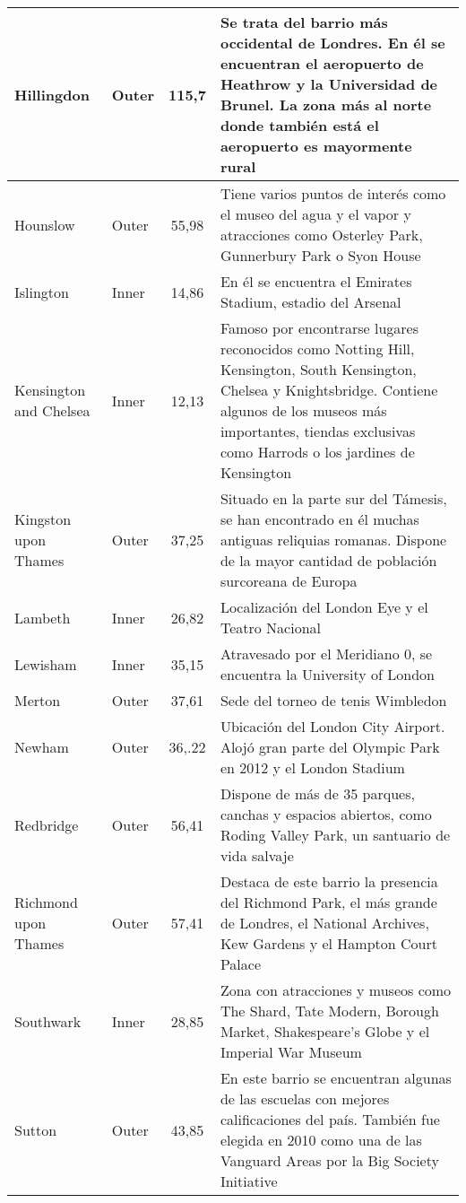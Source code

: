 \documentclass[12pt,a4paper,twoside]{book}
\begin{document}
\begin{longtable}{>{\raggedright\arraybackslash}p{7em}lc>{\raggedright\arraybackslash}m{22em}}
\hline
Hillingdon & Outer & 115,7 & Se trata del barrio más occidental de Londres. En él se encuentran el aeropuerto de Heathrow y la Universidad de Brunel. La zona más al norte donde también está el aeropuerto es mayormente rural \\
\hline
Hounslow & Outer & 55,98 & Tiene varios puntos de interés como el museo del agua y el vapor y atracciones como Osterley Park, Gunnerbury Park o Syon House \\
\hline
Islington & Inner & 14,86 & En él se encuentra el Emirates Stadium, estadio del Arsenal \\
\hline
Kensington and Chelsea & Inner & 12,13 & Famoso por encontrarse lugares reconocidos como Notting Hill, Kensington, South Kensington, Chelsea y Knightsbridge. Contiene algunos de los museos más importantes, tiendas exclusivas como Harrods o los jardines de Kensington \\
\hline
Kingston upon Thames & Outer & 37,25 & Situado en la parte sur del Támesis, se han encontrado en él muchas antiguas reliquias romanas. Dispone de la mayor cantidad de población surcoreana de Europa \\
\hline
Lambeth & Inner & 26,82 & Localización del London Eye y el Teatro Nacional \\
\hline
Lewisham & Inner & 35,15 & Atravesado por el Meridiano 0, se encuentra la University of London \\
\hline
Merton & Outer & 37,61 & Sede del torneo de tenis Wimbledon \\
\hline
Newham & Outer & 36,.22 & Ubicación del London City Airport. Alojó gran parte del Olympic Park en 2012 y el London Stadium \\
\hline
Redbridge & Outer & 56,41 & Dispone de más de 35 parques, canchas y espacios abiertos, como Roding Valley Park, un santuario de vida salvaje \\
\hline
Richmond upon Thames & Outer & 57,41 & Destaca de este barrio la presencia del Richmond Park, el más grande de Londres, el National Archives, Kew Gardens y el Hampton Court Palace \\
\hline
Southwark & Inner & 28,85 & Zona con atracciones y museos como The Shard, Tate Modern, Borough Market, Shakespeare's Globe y el Imperial War Museum \\
\hline
Sutton & Outer & 43,85 & En este barrio se encuentran algunas de las escuelas con mejores calificaciones del país. También fue elegida en 2010 como una de las Vanguard Areas por la Big Society Initiative \\

\end{longtable}
\end{document}
